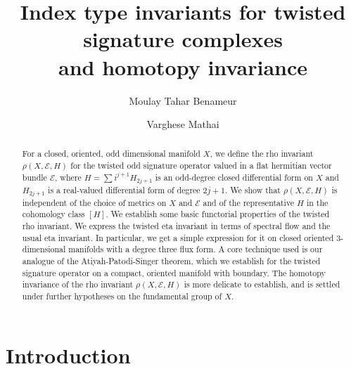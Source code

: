 \documentclass[12pt]{amsart}
\theoremstyle{plain}
\theoremstyle{definition}
\theoremstyle{remark}
\begin{document}
\title[Index type invariants for twisted signature complexes]
{Index type invariants for twisted signature complexes\\ and homotopy invariance}
\author{Moulay Tahar Benameur}
\address{Laboratoire et D\'epartement de Math\'ematiques,
  UMR 7122,
  Universit\'e de Metz et CNRS,
  B\^at. A, Ile du Saulcy,
  F-57045 Metz Cedex 1, 
  France}

\author{Varghese Mathai}
\address{Department of Mathematics, University of Adelaide,
Adelaide 5005, Australia}

\begin{abstract}
For a closed, oriented, odd dimensional manifold $X$, 
we define the rho invariant $\rho(X,{\mathcal E},H)$ for the twisted odd signature operator
valued in a flat hermitian vector bundle ${\mathcal E}$,
where $H = \sum i^{j+1} H_{2j+1} $ is an odd-degree closed differential form on $X$ 
and $H_{2j+1}$ is a real-valued differential form of degree ${2j+1}$.
We show that  $\rho(X,{\mathcal E},H)$ is independent of the
choice of metrics on $X$ and ${\mathcal E}$ and of the representative $H$ in the
cohomology class $[H]$.
We establish some basic functorial properties of the twisted rho invariant.
We express the twisted eta invariant in terms of spectral flow and the usual eta invariant.
In particular, we get a simple expression for it on closed oriented 
3-dimensional manifolds with a degree three flux form. 
A core technique used is our analogue of the Atiyah-Patodi-Singer theorem,
which we establish for the twisted signature operator on a compact, oriented manifold with boundary.
The homotopy invariance of the rho invariant $\rho(X,{\mathcal E},H)$ is more delicate to establish, 
and is settled under further hypotheses on the fundamental group of $X$.
\end{abstract}



\maketitle

\section*{Introduction}
\end{document}
